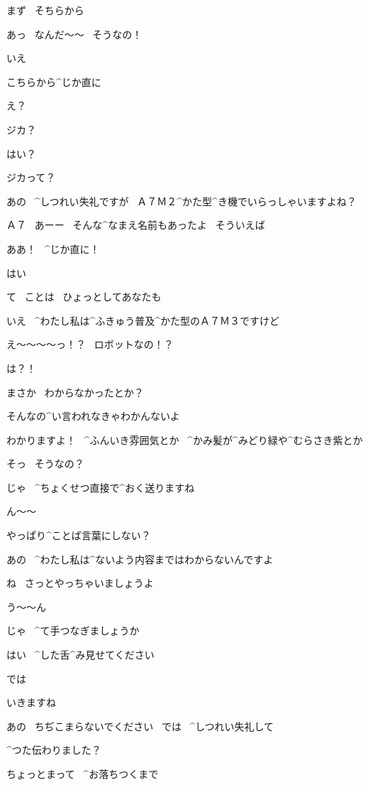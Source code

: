 \Kokone まず
\ そちらから

\Alpha あっ
\ なんだ〜〜
\ そうなの！

\Kokone いえ

\Kokone こちらから^{じか}{直}に

\Alpha え？

\Alpha ジカ？

\Kokone はい？

\Alpha ジカって？

\page
\Kokone あの
\ ^{しつれい}{失礼}ですが
\ Ａ７Ｍ２^{かた}{型}^{き}{機}でいらっしゃいますよね？

\Alpha Ａ７
\ あーー
\ そんな^{なまえ}{名前}もあったよ
\ そういえば

\Alpha ああ！
\ ^{じか}{直}に！

\Kokone はい

\Alpha て
\ ことは
\ ひょっとしてあなたも

\Kokone いえ
\ ^{わたし}{私}は^{ふきゅう}{普及}^{かた}{型}のＡ７Ｍ３ですけど

\page
\Alpha え〜〜〜〜っ！？
\ ロボットなの！？

\Kokone は？！

\Kokone まさか
\ わからなかったとか？

\Alpha そんなの^{い}{言}われなきゃわかんないよ

\Kokone わかりますよ！
\ ^{ふんいき}{雰囲気}とか
\ ^{かみ}{髪}が^{みどり}{緑}や^{むらさき}{紫}とか

\Alpha そっ
\ そうなの？

\page
\Kokone じゃ
\ ^{ちょくせつ}{直接}で^{おく}{送}りますね

\Alpha ん〜〜

\Alpha やっぱり^{ことば}{言葉}にしない？

\Kokone あの
\ ^{わたし}{私}は^{ないよう}{内容}まではわからないんですよ

\Kokone ね
\ さっとやっちゃいましょうよ

\Alpha う〜〜ん

\page
\Kokone じゃ
\ ^{て}{手}つなぎましょうか

\Kokone はい
\ ^{した}{舌}^{み}{見}せてください

\Kokone では

\Kokone いきますね

\Kokone あの
\ ちぢこまらないでください
\ では
\ ^{しつれい}{失礼}して

\page
\Kokone ^{つた}{伝}わりました？

\Alpha ちょっとまって
\ ^{お}{落}ちつくまで


